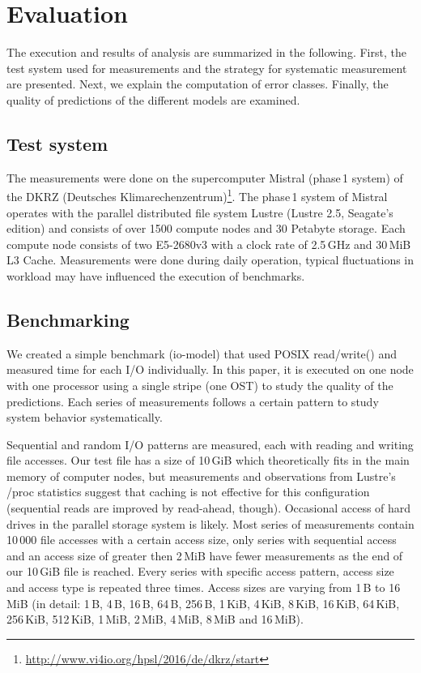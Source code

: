 \documentclass{superfri}
\begin{document}
	\section{Evaluation}
	\label{evaluation}
	The execution and results of analysis are summarized in the following.
	First, the test system used for measurements and the strategy for systematic measurement are presented.
	Next, we explain the computation of error classes.
	Finally, the quality of predictions of the different models are examined.
	
	\subsection{Test system}
	The measurements were done on the supercomputer Mistral (phase\,1 system) of the DKRZ (Deutsches Klimarechenzentrum)\footnote{\url{http://www.vi4io.org/hpsl/2016/de/dkrz/start}}.
	The phase\,1 system of Mistral operates with the parallel distributed file system Lustre (Lustre 2.5, Seagate's edition) and consists of over 1500 compute nodes and 30 Petabyte storage.
	Each compute node consists of two E5-2680v3 with a clock rate of 2.5\,GHz and 30\,MiB L3 Cache.
	Measurements were done during daily operation, typical fluctuations in workload may have influenced the execution of benchmarks.
	
	\subsection{Benchmarking}
	We created a simple benchmark (io-model) that used POSIX read/write() and measured time for each I/O individually.
	In this paper, it is executed on one node with one processor using a single stripe (one OST) to study the quality of the predictions.
	Each series of measurements follows a certain pattern to study system behavior systematically.
	
	Sequential and random I/O patterns are measured, each with reading and writing file accesses.
	Our test file has a size of 10\,GiB which theoretically fits in the main memory of computer nodes, but measurements and observations from Lustre's /proc statistics suggest that caching is not effective for this configuration (sequential reads are improved by read-ahead, though).
	Occasional access of hard drives in the parallel storage system is likely.
	Most series of measurements contain 10\,000 file accesses with a certain access size, only series with sequential access and an access size of greater then 2\,MiB have fewer measurements as the end of our 10\,GiB file is reached.
	Every series with specific access pattern, access size and access type is repeated three times.
	Access sizes are varying from 1\,B to 16\,MiB (in detail:  1\,B, 4\,B, 16\,B, 64\,B, 256\,B, 1\,KiB, 4\,KiB, 8\,KiB, 16\,KiB, 64\,KiB, 256\,KiB, 512\,KiB, 1\,MiB, 2\,MiB, 4\,MiB, 8\,MiB and 16\,MiB).
	
\end{document}
